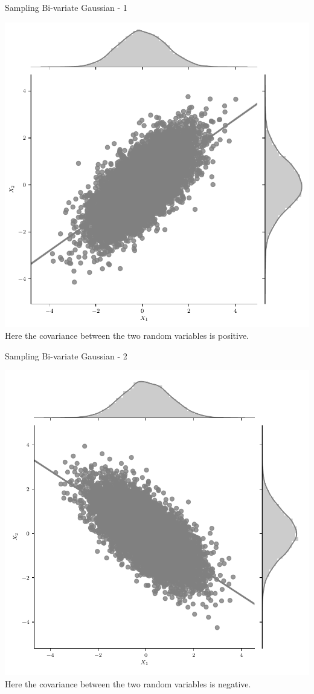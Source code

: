 \documentclass{beamer}
\begin{document}
	\begin{frame}{Sampling Bi-variate Gaussian - 1}
		\begin{center}
			\includegraphics[height=\textheight -45pt ,keepaspectratio]{gp/2d-gp}\\
			Here the covariance between the two random variables is positive.
		\end{center}
	\end{frame}
	
	
	\begin{frame}{Sampling Bi-variate Gaussian - 2}
		\begin{center}
			\includegraphics[height=\textheight -45pt ,keepaspectratio]{gp/2d-gp2}\\
			Here the covariance between the two random variables is negative.
		\end{center}
	\end{frame}
	
\end{document}
